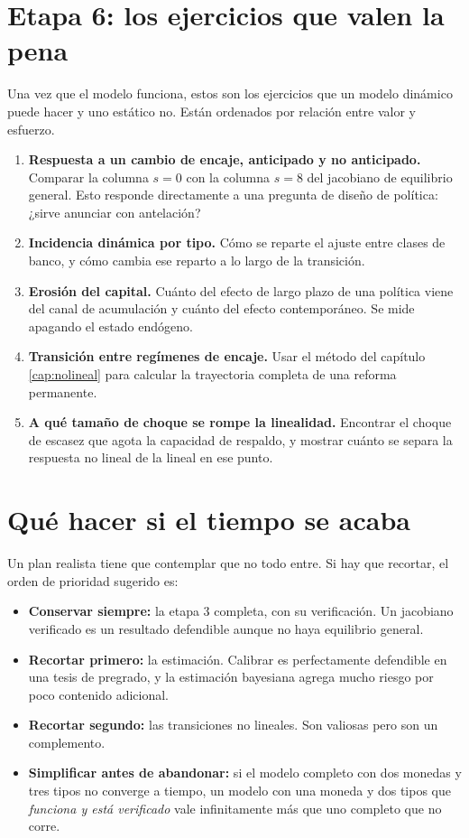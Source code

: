 \section{Etapa 6: los ejercicios que valen la pena}

Una vez que el modelo funciona, estos son los ejercicios que un modelo dinámico
puede hacer y uno estático no. Están ordenados por relación entre valor y
esfuerzo.

\begin{enumerate}[leftmargin=1.4em]
\item \textbf{Respuesta a un cambio de encaje, anticipado y no anticipado.}
Comparar la columna $s=0$ con la columna $s=8$ del jacobiano de equilibrio
general. Esto responde directamente a una pregunta de diseño de política: ¿sirve
anunciar con antelación?
\item \textbf{Incidencia dinámica por tipo.} Cómo se reparte el ajuste entre
clases de banco, y cómo cambia ese reparto a lo largo de la transición.
\item \textbf{Erosión del capital.} Cuánto del efecto de largo plazo de una
política viene del canal de acumulación y cuánto del efecto contemporáneo. Se
mide apagando el estado endógeno.
\item \textbf{Transición entre regímenes de encaje.} Usar el método del capítulo
\ref{cap:nolineal} para calcular la trayectoria completa de una reforma
permanente.
\item \textbf{A qué tamaño de choque se rompe la linealidad.} Encontrar el
choque de escasez que agota la capacidad de respaldo, y mostrar cuánto se separa
la respuesta no lineal de la lineal en ese punto.
\end{enumerate}

\section{Qué hacer si el tiempo se acaba}

Un plan realista tiene que contemplar que no todo entre. Si hay que recortar, el
orden de prioridad sugerido es:

\begin{itemize}[leftmargin=1.4em]
\item \textbf{Conservar siempre:} la etapa 3 completa, con su verificación. Un
jacobiano verificado es un resultado defendible aunque no haya equilibrio general.
\item \textbf{Recortar primero:} la estimación. Calibrar es perfectamente
defendible en una tesis de pregrado, y la estimación bayesiana agrega mucho
riesgo por poco contenido adicional.
\item \textbf{Recortar segundo:} las transiciones no lineales. Son valiosas pero
son un complemento.
\item \textbf{Simplificar antes de abandonar:} si el modelo completo con dos
monedas y tres tipos no converge a tiempo, un modelo con una moneda y dos tipos
que \emph{funciona y está verificado} vale infinitamente más que uno completo que
no corre.
\end{itemize}
